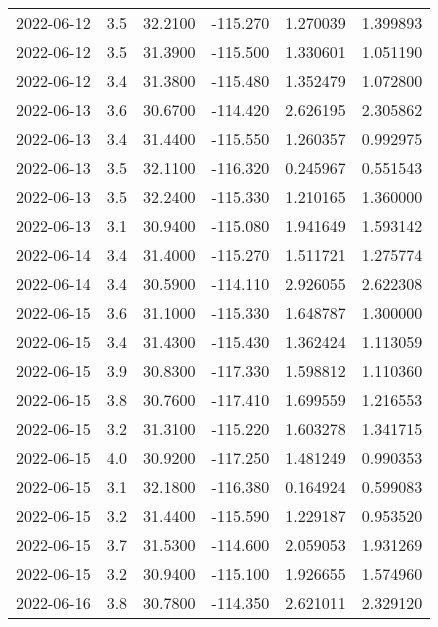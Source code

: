 \begin{tabular}{lrrrrr}
2022-06-12 &       3.5 &  32.2100 &  -115.270 &         1.270039 &         1.399893 \\
2022-06-12 &       3.5 &  31.3900 &  -115.500 &         1.330601 &         1.051190 \\
2022-06-12 &       3.4 &  31.3800 &  -115.480 &         1.352479 &         1.072800 \\
2022-06-13 &       3.6 &  30.6700 &  -114.420 &         2.626195 &         2.305862 \\
2022-06-13 &       3.4 &  31.4400 &  -115.550 &         1.260357 &         0.992975 \\
2022-06-13 &       3.5 &  32.1100 &  -116.320 &         0.245967 &         0.551543 \\
2022-06-13 &       3.5 &  32.2400 &  -115.330 &         1.210165 &         1.360000 \\
2022-06-13 &       3.1 &  30.9400 &  -115.080 &         1.941649 &         1.593142 \\
2022-06-14 &       3.4 &  31.4000 &  -115.270 &         1.511721 &         1.275774 \\
2022-06-14 &       3.4 &  30.5900 &  -114.110 &         2.926055 &         2.622308 \\
2022-06-15 &       3.6 &  31.1000 &  -115.330 &         1.648787 &         1.300000 \\
2022-06-15 &       3.4 &  31.4300 &  -115.430 &         1.362424 &         1.113059 \\
2022-06-15 &       3.9 &  30.8300 &  -117.330 &         1.598812 &         1.110360 \\
2022-06-15 &       3.8 &  30.7600 &  -117.410 &         1.699559 &         1.216553 \\
2022-06-15 &       3.2 &  31.3100 &  -115.220 &         1.603278 &         1.341715 \\
2022-06-15 &       4.0 &  30.9200 &  -117.250 &         1.481249 &         0.990353 \\
2022-06-15 &       3.1 &  32.1800 &  -116.380 &         0.164924 &         0.599083 \\
2022-06-15 &       3.2 &  31.4400 &  -115.590 &         1.229187 &         0.953520 \\
2022-06-15 &       3.7 &  31.5300 &  -114.600 &         2.059053 &         1.931269 \\
2022-06-15 &       3.2 &  30.9400 &  -115.100 &         1.926655 &         1.574960 \\
2022-06-16 &       3.8 &  30.7800 &  -114.350 &         2.621011 &         2.329120 \\

\end{tabular}
